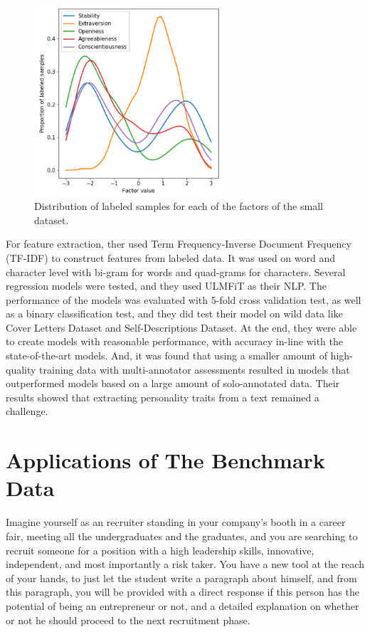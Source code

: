 \begin{figure}[H]
\centering
\includegraphics[width=7cm]{Figure5}
\caption{Distribution of labeled samples for each of the factors of the small dataset.}
\end{figure}

For feature extraction, ther used Term Frequency-Inverse Document Frequency (TF-IDF) to construct features from labeled data. It was used on word and character level with bi-gram for words and quad-grams for characters. Several regression models were tested, and they used ULMFiT as their NLP. The performance of the models was evaluated with 5-fold cross validation test, as well as a binary classification test, and they did test their model on wild data like Cover Letters Dataset and Self-Descriptions Dataset. At the end, they were able to create models with reasonable performance, with accuracy in-line with the state-of-the-art models. And, it was found that using a smaller amount of high-quality training data with multi-annotator assessments resulted in models that outperformed models based on a large amount of solo-annotated data. Their results showed that extracting personality traits from a text remained a challenge.

\section{Applications of The Benchmark Data}
Imagine yourself as an recruiter standing in your company's booth in a career fair, meeting all the undergraduates and the graduates, and you are searching to recruit someone for a position with a high leadership skills, innovative, independent, and most importantly a risk taker. You have a new tool at the reach of your hands, to just let the student write a paragraph about himself, and from this paragraph, you will be provided with a direct response if this person has the potential of being an entrepreneur or not, and a detailed explanation on whether or not he should proceed to the next recruitment phase.

